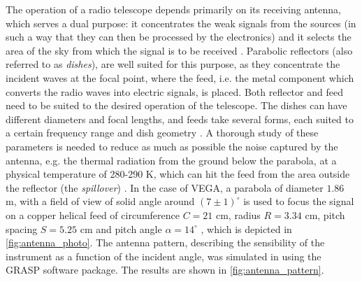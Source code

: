 The operation of a radio telescope depends primarily on its receiving antenna, which serves a dual purpose: it concentrates the weak signals from the sources (in such a way that they can then be processed by the electronics) and it selects the area of the sky from which the signal is to be received \cite{lauterbach_radio_2022}.
Parabolic reflectors (also referred to as \emph{dishes}), are well suited for this purpose, as they concentrate the incident waves at the focal point, where the feed, i.e. the metal component which converts the radio waves into electric signals, is placed.
Both reflector and feed need to be suited to the desired operation of the telescope.
The dishes can have different diameters and focal lengths, and
feeds take several forms, each suited to a certain frequency range and dish geometry \cite{lauterbach_radio_2022}. 
A thorough study of these parameters is needed to reduce as much as possible the noise captured by the antenna, e.g. the thermal radiation from the ground below the parabola, at a physical temperature of 280-290 K, which can hit the feed from the area outside the reflector (the \emph{spillover}) \cite{burke_introduction_2013}.
In the case of VEGA, a parabola of diameter $1.86$ m, with a field of view of solid angle around $(7 \pm 1)^{\circ}$ is used to focus the signal on a copper helical feed of circumference $C = 21$ cm, radius $R = 3.34$ cm, pitch spacing $S = 5.25$ cm and pitch angle $\alpha = 14^{\circ}$ \cite{interdisciplinary_project_2022} \cite{rapport_interne_2024}, which is depicted in \autoref{fig:antenna_photo}. The antenna pattern, describing the sensibility of the instrument as a function of the incident angle, was simulated in \cite{rapport_interne_2024} using the GRASP software package. The results are shown in \autoref{fig:antenna_pattern}.
